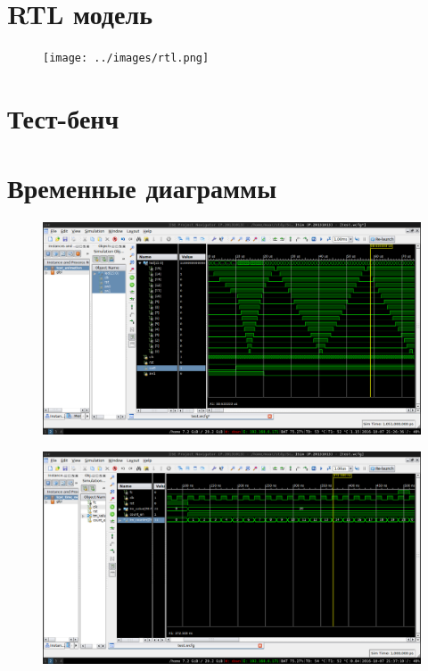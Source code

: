 \documentclass[a4paper, 10pt]{article}
\begin{document}
     \section*{RTL модель}
        \begin{figure}[h!]
            \texttt{[image: ../images/rtl.png]}
        \end{figure}
     \section*{Тест-бенч}
        
        
        
     \section*{Временные диаграммы}
        \begin{figure}[h!]
            \includegraphics[scale=0.7]{../images/animation.png}
        \end{figure}
        \begin{figure}[h!]
            \includegraphics[scale=0.7]{../images/time_mode.png}
        \end{figure}
\end{document}
